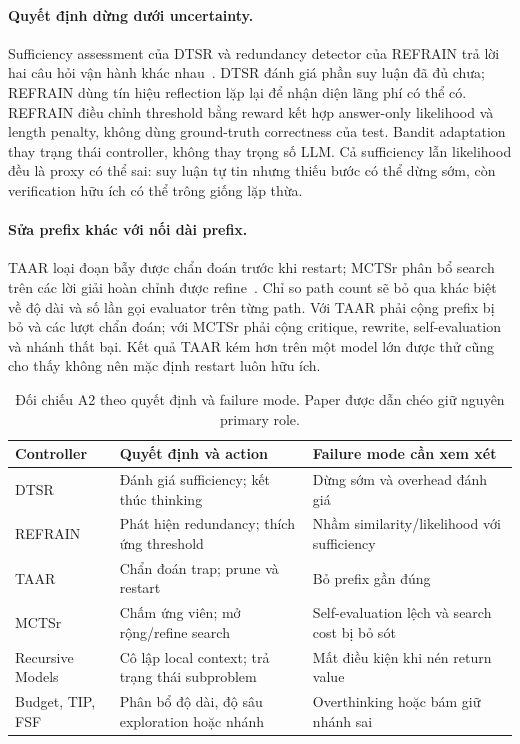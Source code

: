 \paragraph{Quyết định dừng dưới uncertainty.}
Sufficiency assessment của DTSR và redundancy detector của REFRAIN trả lời hai câu hỏi vận hành khác nhau~\cite{rra2_dtsr,rra2_refrain}. DTSR đánh giá phần suy luận đã đủ chưa; REFRAIN dùng tín hiệu reflection lặp lại để nhận diện lãng phí có thể có. REFRAIN điều chỉnh threshold bằng reward kết hợp answer-only likelihood và length penalty, không dùng ground-truth correctness của test. Bandit adaptation thay trạng thái controller, không thay trọng số LLM. Cả sufficiency lẫn likelihood đều là proxy có thể sai: suy luận tự tin nhưng thiếu bước có thể dừng sớm, còn verification hữu ích có thể trông giống lặp thừa.

\paragraph{Sửa prefix khác với nối dài prefix.}
TAAR loại đoạn bẫy được chẩn đoán trước khi restart; MCTSr phân bổ search trên các lời giải hoàn chỉnh được refine~\cite{rra2_taar,rra2_mctsr}. Chỉ so path count sẽ bỏ qua khác biệt về độ dài và số lần gọi evaluator trên từng path. Với TAAR phải cộng prefix bị bỏ và các lượt chẩn đoán; với MCTSr phải cộng critique, rewrite, self-evaluation và nhánh thất bại. Kết quả TAAR kém hơn trên một model lớn được thử cũng cho thấy không nên mặc định restart luôn hữu ích.

\begin{table}[htbp]
\centering\small
\begin{tabularx}{\textwidth}{>{\raggedright\arraybackslash}p{2.3cm}>{\raggedright\arraybackslash}X>{\raggedright\arraybackslash}X}
\toprule
\textbf{Controller} & \textbf{Quyết định và action} & \textbf{Failure mode cần xem xét} \\
\midrule
DTSR & Đánh giá sufficiency; kết thúc thinking & Dừng sớm và overhead đánh giá \\
REFRAIN & Phát hiện redundancy; thích ứng threshold & Nhầm similarity/likelihood với sufficiency \\
TAAR & Chẩn đoán trap; prune và restart & Bỏ prefix gần đúng \\
MCTSr & Chấm ứng viên; mở rộng/refine search & Self-evaluation lệch và search cost bị bỏ sót \\
Recursive Models & Cô lập local context; trả trạng thái subproblem & Mất điều kiện khi nén return value \\
Budget, TIP, FSF & Phân bổ độ dài, độ sâu exploration hoặc nhánh & Overthinking hoặc bám giữ nhánh sai \\
\bottomrule
\end{tabularx}
\caption{Đối chiếu A2 theo quyết định và failure mode. Paper được dẫn chéo giữ nguyên primary role.}
\label{tab:a2_comparison}
\end{table}

